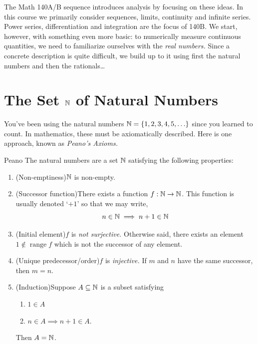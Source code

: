 The Math 140A/B sequence introduces analysis by focusing on these ideas. In this course we primarily consider sequences, limits, continuity and infinite series. Power series, differentiation and integration are the focus of 140B. We start, however, with something even more basic: to numerically measure continuous quantities, we need to familiarize ourselves with the \emph{real numbers.} Since a concrete description is quite difficult, we build up to it using first the natural numbers and then the rationals\ldots

\goodbreak

\section[The Set N of Natural Numbers]{The Set $\mathbb{N}$ of Natural Numbers}\label{sec:natural}

You've been using the natural numbers $\mathbb{N}=\{1,2,3,4,5,\ldots\}$ since you learned to count. In mathematics, these must be axiomatically described. Here is one approach, known as \emph{Peano's Axioms.}%

\begin{axioms}{}{Peano}
	The natural numbers are a set $\mathbb{N}$ satisfying the following properties:
	\begin{enumerate}
	  \item (Non-emptiness)\lstsp $\mathbb{N}$ is non-empty.
		\item (Successor function)\lstsp There exists a function $f:\mathbb{N}\to\mathbb{N}$. This function is usually denoted `$+1$' so that we may write,
		\[n\in\mathbb{N}\implies n+1\in\mathbb{N}\]
		\item (Initial element)\lstsp $f$ is \emph{not surjective.} Otherwise said, there exists an element $1\not\in\operatorname{range}f$ which is not the successor of any element.\footnotemark
		\item (Unique predecessor/order)\lstsp $f$ is \emph{injective.} If $m$ and $n$ have the same successor, then $m=n$. 
		\item (Induction)\lstsp Suppose $A\subseteq\mathbb{N}$ is a subset satisfying
		\begin{enumerate}
		  \item $1\in A$
		  \item $n\in A\implies n+1\in A$.
		\end{enumerate}
		Then $A=\mathbb{N}$.
	\end{enumerate}
\end{axioms}

